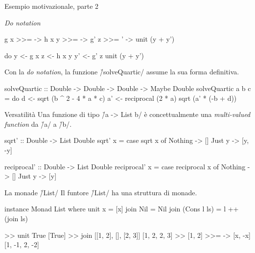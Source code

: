 \begin{frame}[fragile]{\secname}{Esempio motivazionale, parte 2}
\begin{block}{\emph{Do notation}}
\begin{minipage}[t]{0.48\textwidth}
\vspace{-0.3cm}
\begin{haskellcode}
    g x   >>= \y  ->
    h x y >>= \z  ->
    g' z  >>= \y' ->
    unit (y + y')
\end{haskellcode}
\end{minipage}
\hfill\pause
\begin{minipage}[t]{0.48\textwidth}
\vspace{-0.3cm}
\begin{haskellcode}
do  y  <- g x
    z  <- h x y
    y' <- g' z
    unit (y + y')
\end{haskellcode}
\end{minipage}
\end{block}
\pause

Con la \emph{do notation}, la funzione \h/solveQuartic/ assume la sua forma definitiva.
\pause

\begin{haskellcode}
solveQuartic
    :: Double -> Double -> Double -> Maybe Double
solveQuartic a b c = do
    d  <- sqrt (b ^ 2 - 4 * a * c)
    a' <- reciprocal (2 * a)
    sqrt (a' * (-b + d))
\end{haskellcode}
\end{frame}

\begin{frame}[fragile]{\secname}{Versatilità}
Una funzione di tipo \h/a -> List b/ è concettualmente una \emph{multi-valued function} da \h/a/ a \h/b/.
\pause

\begin{haskellcode}
sqrt' :: Double -> List Double
sqrt' x = case sqrt x of
    Nothing -> []
    Just y  -> [y, -y]

reciprocal' :: Double -> List Double
reciprocal' x = case reciprocal x of
    Nothing -> []
    Just y  -> [y]
\end{haskellcode}
\end{frame}

\begin{frame}[fragile]{\secname}{La monade \h/List/}
Il funtore \h/List/ ha una struttura di monade.
\pause

\begin{haskellcode}
instance Monad List where
    unit x = [x]
    join Nil = Nil
    join (Cons l ls) = l ++ (join ls)
\end{haskellcode}
\pause

\begin{runhaskell}
>>  unit True
    [True]
>>  join [[1, 2], [], [2, 3]]
    [1, 2, 2, 3]
>>  [1, 2] >>= \x -> [x, -x]
    [1, -1, 2, -2]
\end{runhaskell}
\end{frame}

